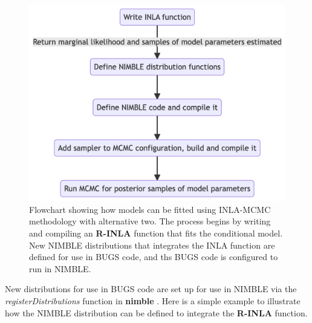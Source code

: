 \documentclass[
]{article}
\begin{document}
\begin{figure}

{\centering \includegraphics{flowxchartINLANimbleAlt2.png}

}

\caption{\label{fig-flowchartAlt2}Flowchart showing how models can be
fitted using INLA-MCMC methodology with alternative two. The process
begins by writing and compiling an \textbf{R-INLA} function that fits
the conditional model. New NIMBLE distributions that integrates the INLA
function are defined for use in BUGS code, and ths BUGS code is
configured to run in NIMBLE.}

\end{figure}

New distributions for use in BUGS code are set up for use in NIMBLE via
the \textit{registerDistributions} function in \textbf{nimble}
\citep[for further details on writing new distributions in NIMBLE, see Chapter 12.2 of ][]{nimblemanual}.
Here is a simple example to illustrate how the NIMBLE distribution can
be defined to integrate the \textbf{R-INLA} function.
\end{document}
